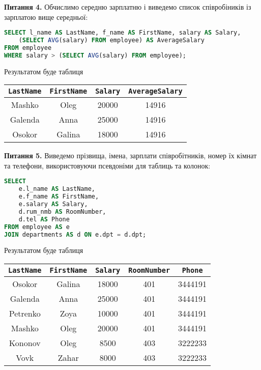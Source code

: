 \documentclass{hw_template}
\begin{document}
\textbf{Питання 4.} Обчислимо середню зарплатню і виведемо список співробіників із зарплатою вище середньої:
\begin{lstlisting}[language=SQL]
SELECT l_name AS LastName, f_name AS FirstName, salary AS Salary, 
    (SELECT AVG(salary) FROM employee) AS AverageSalary
FROM employee
WHERE salary > (SELECT AVG(salary) FROM employee);
\end{lstlisting}

Результатом буде таблиця

\begin{table}[H]
    \centering
    \begin{tabular}{|c|c|c|c|}
        \hline
        \texttt{LastName} & \texttt{FirstName} & \texttt{Salary} & \texttt{AverageSalary} \\
        \hline
        Mashko & Oleg & 20000 & 14916 \\
        Galenda & Anna & 25000 & 14916 \\
        Osokor & Galina & 18000 & 14916 \\
        \hline
    \end{tabular}
\end{table}

\textbf{Питання 5.} Виведемо прізвища, імена, зарплати співробітників, номер їх 
кімнат та телефони, використовуючи псевдоніми для таблиць та колонок:
\begin{lstlisting}[language=SQL]
SELECT 
    e.l_name AS LastName, 
    e.f_name AS FirstName, 
    e.salary AS Salary, 
    d.rum_nmb AS RoomNumber, 
    d.tel AS Phone
FROM employee AS e
JOIN departments AS d ON e.dpt = d.dpt;
\end{lstlisting}

Результатом буде таблиця
\begin{table}[H]
    \centering
    \begin{tabular}{|c|c|c|c|c|}
        \hline
        \texttt{LastName} & \texttt{FirstName} & \texttt{Salary} & \texttt{RoomNumber} & \texttt{Phone} \\
        \hline
        Osokor & Galina & 18000 & 401 & 3444191 \\
        Galenda & Anna & 25000 & 401 & 3444191 \\
        Petrenko & Zoya & 10000 & 401 & 3444191 \\
        Mashko & Oleg & 20000 & 401 & 3444191 \\
        Kononov & Oleg & 8500 & 403 &3222233 \\
        Vovk & Zahar & 8000 & 403 & 3222233 \\
        \hline
    \end{tabular}
\end{table}
\end{document}
